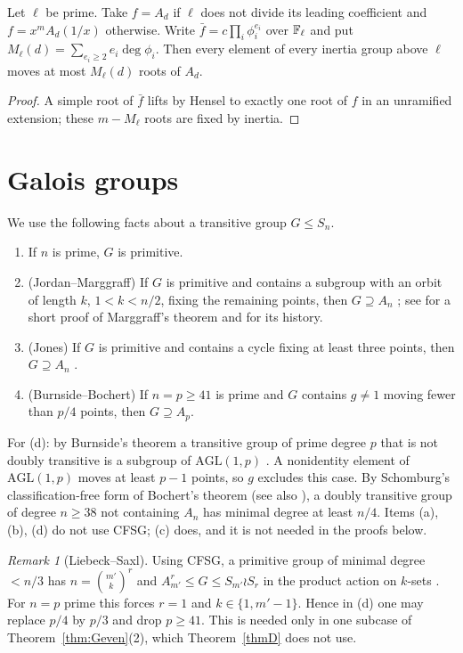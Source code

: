 \documentclass[11pt]{amsart}
\theoremstyle{definition}\newtheorem{definition}[theorem]{Definition}\newtheorem{example}[theorem]{Example}
\theoremstyle{remark}\newtheorem{remark}[theorem]{Remark}
\begin{document}
\begin{lemma}\label{lem:support}
Let $\ell$ be prime. Take $f=A_d$ if $\ell$ does not divide its leading coefficient and $f=x^mA_d(1/x)$ otherwise. Write
$\bar f=c\prod_i\phi_i^{e_i}$ over $\mathbb F_\ell$ and put $M_\ell(d)=\sum_{e_i\ge2}e_i\deg\phi_i$. Then every element of every inertia group above
$\ell$ moves at most $M_\ell(d)$ roots of $A_d$.
\end{lemma}
\begin{proof}
A simple root of $\bar f$ lifts by Hensel to exactly one root of $f$ in an unramified extension; these $m-M_\ell$ roots are fixed by inertia.
\end{proof}

\section{Galois groups}\label{sec:galois}
We use the following facts about a transitive group $G\le S_n$.
\begin{enumerate}
\item[(a)] If $n$ is prime, $G$ is primitive.
\item[(b)] (Jordan--Marggraff) If $G$ is primitive and contains a subgroup with an orbit of length $k$, $1<k<n/2$, fixing the remaining points,
then $G\supseteq A_n$ \cite[Thms~13.4--13.5]{Wielandt}; see \cite{LT} for a short proof of Marggraff's theorem and \cite{Jones} for its history.
\item[(c)] (Jones) If $G$ is primitive and contains a cycle fixing at least three points, then $G\supseteq A_n$ \cite[Cor.~1.3]{Jones}.
\item[(d)] (Burnside--Bochert) If $n=p\ge41$ is prime and $G$ contains $g\ne1$ moving fewer than $p/4$ points, then $G\supseteq A_p$.
\end{enumerate}
For (d): by Burnside's theorem a transitive group of prime degree $p$ that is not doubly transitive is a subgroup of $\mathrm{AGL}(1,p)$ \cite{Muller}.
A nonidentity element of $\mathrm{AGL}(1,p)$ moves at least $p-1$ points, so $g$ excludes this case. By Schomburg's classification-free form of
Bochert's theorem \cite[Thm~3.1]{Schomburg} (see also \cite{Bochert97}), a doubly transitive group of degree $n\ge38$ not containing $A_n$ has
minimal degree at least $n/4$. Items (a), (b), (d) do not use CFSG; (c) does, and it is not needed in the proofs below.

\begin{remark}[Liebeck--Saxl]\label{rem:LS}
Using CFSG, a primitive group of minimal degree $<n/3$ has $n=\binom{m'}{k}^r$ and $A_{m'}^r\le G\le S_{m'}\wr S_r$ in the product action on
$k$-sets \cite{LS}. For $n=p$ prime this forces $r=1$ and $k\in\{1,m'-1\}$. Hence in (d) one may replace $p/4$ by $p/3$ and drop $p\ge41$. This is
needed only in one subcase of Theorem~\ref{thm:Geven}(2), which Theorem~\ref{thmD} does not use.
\end{remark}
\end{document}
